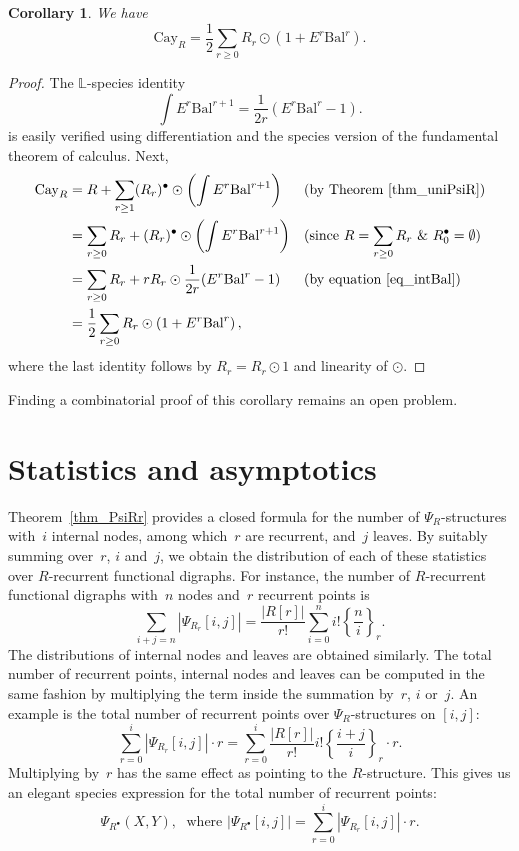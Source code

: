 \documentclass[a4paper,11pt,UKenglish]{article}
\newcommand{\LL}{\mathbb{L}}
\newcommand{\Set}{E}
\newcommand{\Bal}{\mathrm{Bal}}
\newcommand{\Cay}{\mathrm{Cay}}
\newcommand{\sdiff}[3]{\genfrac{\{}{\}}{}{}{{#1}}{{#2}}_{{#3}}}
\newtheorem{corollary}[theorem]{Corollary}
\theoremstyle{definition}
\begin{document}
\begin{corollary}
We have
$$
\Cay_R
=\frac{1}{2}\sum_{r\ge 0} R_r\odot\left(1+\Set^r\Bal^r\right).
$$
\end{corollary}
\begin{proof}
The $\LL$-species identity
\begin{equation}
\int\Set^r\Bal^{r+1}=\frac{1}{2r}(\Set^r\Bal^r-1).\label{eq_intBal}
\end{equation}
is easily verified using differentiation and the species version of the
fundamental theorem of calculus.
Next,
\begin{align*}
\Cay_{R} &= R + \sum_{r\ge 1}
(R_r)^{\bullet}\odot\left(\int\Set^r\Bal^{r+1}\right)
&& \text{(by Theorem~\ref{thm_uniPsiR})}\\
&= \sum_{r\ge 0}
R_r+(R_r)^{\bullet}\odot\left(\int\Set^r\Bal^{r+1}\right)
&& \text{(since $R=\sum_{r\ge 0}R_r$ \& $R^{\bullet}_0=\emptyset$)}\\
&= \sum_{r\ge 0}
R_r+rR_r\odot\frac{1}{2r}(\Set^r\Bal^r-1)
&& \text{(by equation~\eqref{eq_intBal})}\\
&= \frac{1}{2}\sum_{r\ge 0} R_r\odot\left(1+\Set^r\Bal^r\right),
\end{align*}
where the last identity follows by $R_r=R_r\odot 1$ and linearity of $\odot$.
\end{proof}

Finding a combinatorial proof of this corollary remains an open problem.

\section{Statistics and asymptotics}\label{section_stats}

Theorem~\ref{thm_PsiRr} provides a closed formula
for the number of $\Psi_R$-structures with~$i$ internal nodes,
among which~$r$ are recurrent, and~$j$ leaves. By suitably summing
over~$r$, $i$ and~$j$, we obtain the distribution of each of these
statistics over $R$-recurrent functional digraphs. For instance,
the number of $R$-recurrent functional digraphs with~$n$ nodes
and~$r$ recurrent points is
\[
\sum_{i+j=n}|\Psi_{R_r}[i,j]|
=\frac{|R[r]|}{r!}\sum_{i=0}^ni!\sdiff{n}{i}{r}.
\]
The distributions of internal nodes and leaves are obtained similarly.
The total number of recurrent points, internal nodes and leaves
can be computed in the same fashion
by multiplying the term inside the summation by~$r$, $i$ or~$j$.
An example is the total number of recurrent points
over $\Psi_R$-structures on $[i,j]$:
\[
\sum_{r=0}^i|\Psi_{R_r}[i,j]|\cdot r
=\sum_{r=0}^i\frac{|R[r]|}{r!}i!\sdiff{i+j}{i}{r}\cdot r.
\]
Multiplying by~$r$ has the same effect as pointing to the
$R$-structure. This gives us an elegant species expression for
the total number of recurrent points:
\begin{equation}
\Psi_{R^{\bullet}}(X,Y),\;
\text{ where }
|\Psi_{R^{\bullet}}[i,j]|
=\sum_{r=0}^i|\Psi_{R_r}[i,j]|\cdot r.
\end{equation}
\end{document}
